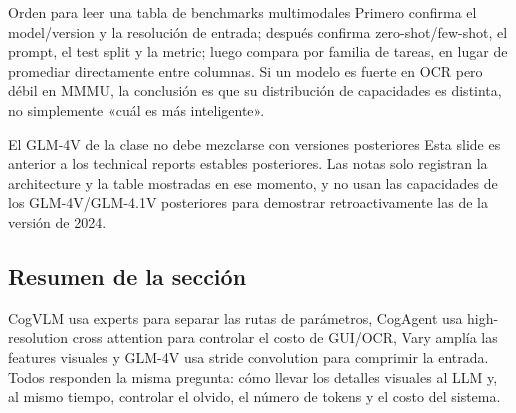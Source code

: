 
\begin{knowledgebox}{Orden para leer una tabla de benchmarks multimodales}
Primero confirma el model/version y la resolución de entrada; después confirma zero-shot/few-shot, el prompt, el test split y la metric; luego compara por familia de tareas, en lugar de promediar directamente entre columnas. Si un modelo es fuerte en OCR pero débil en MMMU, la conclusión es que su distribución de capacidades es distinta, no simplemente «cuál es más inteligente».
\end{knowledgebox}

\begin{warningbox}{El GLM-4V de la clase no debe mezclarse con versiones posteriores}
Esta slide es anterior a los technical reports estables posteriores. Las notas solo registran la architecture y la table mostradas en ese momento, y no usan las capacidades de los GLM-4V/GLM-4.1V posteriores para demostrar retroactivamente las de la versión de 2024.
\end{warningbox}

\subsection{Resumen de la sección}

CogVLM usa experts para separar las rutas de parámetros, CogAgent usa high-resolution cross attention para controlar el costo de GUI/OCR, Vary amplía las features visuales y GLM-4V usa stride convolution para comprimir la entrada. Todos responden la misma pregunta: cómo llevar los detalles visuales al LLM y, al mismo tiempo, controlar el olvido, el número de tokens y el costo del sistema.
